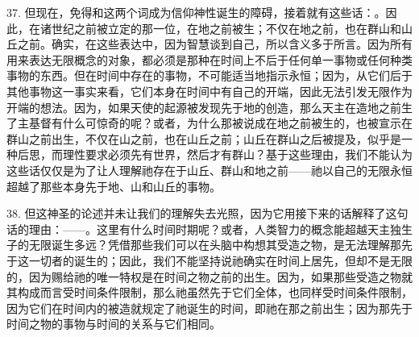 37. 但现在，免得和这两个词成为信仰神性诞生的障碍，接着就有这些话：。因此，在诸世纪之前被立定的那一位，在地之前被生；不仅在地之前，也在群山和山丘之前。确实，在这些表达中，因为智慧谈到自己，所以含义多于所言。因为所有用来表达无限概念的对象，都必须是那种在时间上不后于任何单一事物或任何种类事物的东西。但在时间中存在的事物，不可能适当地指示永恒；因为，从它们后于其他事物这一事实来看，它们本身在时间中有自己的开端，因此无法引发无限作为开端的想法。因为，如果天使的起源被发现先于地的创造，那么天主在造地之前生了主基督有什么可惊奇的呢？或者，为什么那被说成在地之前被生的，也被宣示在群山之前出生，不仅在山之前，也在山丘之前；山丘在群山之后被提及，似乎是一种后思，而理性要求必须先有世界，然后才有群山？基于这些理由，我们不能认为这些话仅仅是为了让人理解祂存在于山丘、群山和地之前——祂以自己的无限永恒超越了那些本身先于地、山和山丘的事物。\par

38. 但这神圣的论述并未让我们的理解失去光照，因为它用接下来的话解释了这句话的理由：——。这里有什么时间时期呢？或者，人类智力的概念能超越天主独生子的无限诞生多远？凭借那些我们可以在头脑中构想其受造之物，是无法理解那先于这一切者的诞生的；因此，我们不能坚持说祂确实在时间上居先，但却不是无限的，因为赐给祂的唯一特权是在时间之物之前的出生。因为，如果那些受造之物就其构成而言受时间条件限制，那么祂虽然先于它们全体，也同样受时间条件限制，因为它们在时间内的被造就规定了祂诞生的时间，即祂在那之前出生；因为那先于时间之物的事物与时间的关系与它们相同。\par

